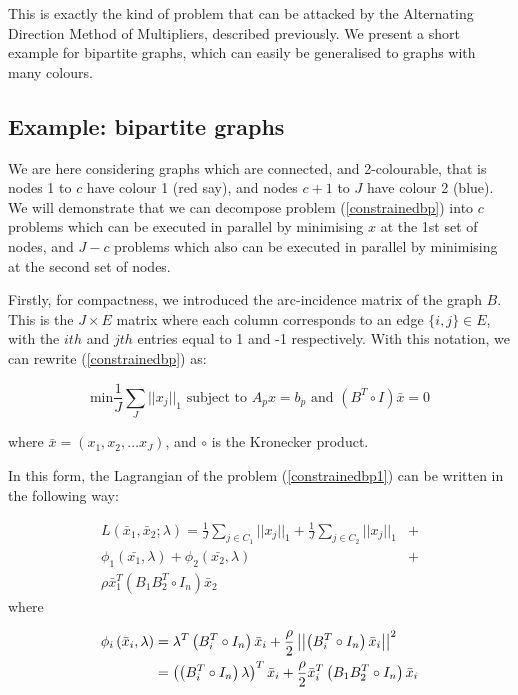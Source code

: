 \documentclass[titlepage]{article}
\begin{document}
This is exactly the kind of problem that can be attacked by the Alternating Direction Method of Multipliers, described previously. We present a short example for bipartite graphs, which can easily be generalised to graphs with many colours. 
 
\subsection{Example: bipartite graphs}
We are here considering graphs which are connected, and 2-colourable, that is nodes 1 to \(c\) have colour 1 (red say), and nodes \(c+1\) to \(J\) have colour 2 (blue). We will demonstrate that we can decompose problem (\ref{constrainedbp}) into \(c\) problems which can be executed in parallel by minimising \(x\) at the 1st set of nodes, and \(J - c\) problems which also can be executed in parallel by minimising at the second set of nodes. 

Firstly, for compactness, we introduced the arc-incidence matrix of the graph \(B\). This is the \(J \times E\) matrix where each column corresponds to an edge \(\{i,j\} \in E\), with the \(ith\) and \(jth\) entries equal to 1 and -1 respectively. With this notation, we can rewrite (\ref{constrainedbp}) as:

\begin{equation}
\text{min} \frac{1}{J}\sum_J||x_j||_1 \text{ subject to } A_p x = b_p \text{ and } \left(B^T \circ I \right)\bar{x} = 0 
 \label{constrainedbp1}
\end{equation}

where \(\bar{x} = \left(x_1, x_2, \ldots x_J \right)\), and \(\circ\) is the Kronecker product. 

In this form, the Lagrangian of the problem (\ref{constrainedbp1}) can be written in the following way:

\begin{align}
L\left(\bar{x}_1, \bar{x}_2; \lambda\right) = \frac{1}{J}\sum_{j \in C_1}||x_j||_1 + \frac{1}{J}\sum_{j \in C_2}||x_j||_1 &+ \\ \phi_1\left(\bar{x_1}, \lambda\right) + \phi_2\left(\bar{x_2}, \lambda\right) &+ \\
\rho\bar{x}_1^T\left(B_1B_2^T\circ I_n\right)\bar{x}_2
\end{align}
where 

\begin{align}
\phi_i\left(\bar{x}_i, \lambda\right) &= \lambda^T\left(B_i^T\circ I_n\right)\bar{x}_i + \frac{\rho}{2}\left|\left|\left(B_i^T\circ I_n\right)\bar{x}_i \right|\right|^2 \\
&= \left(\left(B_i^T\circ I_n\right)\lambda \right)^T\bar{x}_i + \frac{\rho}{2}\bar{x}_i^T\left(B_1B_2^T\circ I_n\right)\bar{x}_i
\end{align}
\end{document}
